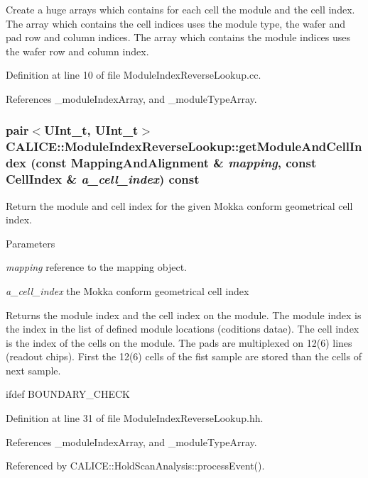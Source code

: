 Create a huge arrays which contains for each cell the module and the cell index. The array which contains the cell indices uses the module type, the wafer and pad row and column indices. The array which contains the module indices uses the wafer row and column index. 

Definition at line 10 of file ModuleIndexReverseLookup.cc.

References \_\-moduleIndexArray, and \_\-moduleTypeArray.
\subsubsection[{getModuleAndCellIndex}]{\setlength{\rightskip}{0pt plus 5cm}pair$<$UInt\_\-t, UInt\_\-t$>$ CALICE::ModuleIndexReverseLookup::getModuleAndCellIndex (const MappingAndAlignment \& {\em mapping}, \/  const CellIndex \& {\em a\_\-cell\_\-index}) const\hspace{0.3cm}{\ttfamily  [inline]}}\label{classCALICE_1_1ModuleIndexReverseLookup_a639f10b89a671e6259c9e2d3ae98965f}


Return the module and cell index for the given Mokka conform geometrical cell index. 
\begin{DoxyParams}{Parameters}
\item[{\em mapping}]reference to the mapping object. \item[{\em a\_\-cell\_\-index}]the Mokka conform geometrical cell index \end{DoxyParams}
\begin{DoxyReturn}{Returns}
the module index and the cell index on the module. The module index is the index in the list of defined module locations (coditions datae). The cell index is the index of the cells on the module. The pads are multiplexed on 12(6) lines (readout chips). First the 12(6) cells of the fist sample are stored than the cells of next sample. 
\end{DoxyReturn}


ifdef BOUNDARY\_\-CHECK 

Definition at line 31 of file ModuleIndexReverseLookup.hh.

References \_\-moduleIndexArray, and \_\-moduleTypeArray.

Referenced by CALICE::HoldScanAnalysis::processEvent().

